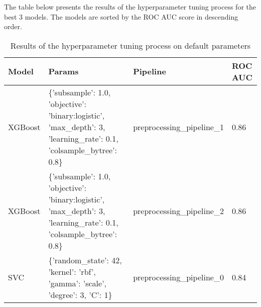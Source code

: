 \documentclass{article}%
\begin{document}
%
The table below presents the results of the hyperparameter tuning process for the best 3 models. The models are sorted by the ROC AUC score in descending order.%


\begin{table}[H]%
\begin{center}%
\begin{tabular}{p{15mm} p{50mm} p{60mm} p{10mm}}%
\hline%
\textbf{Model}&\textbf{Params}&\textbf{Pipeline}&\textbf{ROC AUC}\\%
\hline%
XGBoost&\{'subsample': 1.0, 'objective': 'binary:logistic', 'max\_depth': 3, 'learning\_rate': 0.1, 'colsample\_bytree': 0.8\}&preprocessing\_pipeline\_1&0.86\\%
XGBoost&\{'subsample': 1.0, 'objective': 'binary:logistic', 'max\_depth': 3, 'learning\_rate': 0.1, 'colsample\_bytree': 0.8\}&preprocessing\_pipeline\_2&0.86\\%
SVC&\{'random\_state': 42, 'kernel': 'rbf', 'gamma': 'scale', 'degree': 3, 'C': 1\}&preprocessing\_pipeline\_0&0.84\\%
\hline%
\end{tabular}%
\end{center}%
\caption{Results of the hyperparameter tuning process on default parameters}%
\end{table}

%
\end{document}
